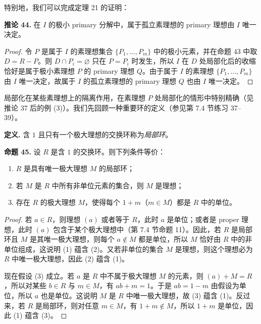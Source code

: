 特别地，我们可以完成定理 21 的证明：

\noindent\textbf{推论 44.} 在 $I$ 的极小 primary 分解中，属于孤立素理想的 primary 理想由 $I$ 唯一决定。

\begin{proof}
	令 $P$ 是属于 $I$ 的素理想集合 $\{P_1,\ldots,P_m\}$ 中的极小元素，并在命题 43 中取 $D=R-P$。则 $D\cap P_i=\varnothing$ 只在 $P=P_i$ 时发生，所以 $I$ 在 $D$ 处局部化后的收缩恰好是属于极小素理想 $P$ 的 primary 理想 $Q$。由于属于 $I$ 的素理想 $\{P_1,\ldots,P_m\}$ 由 $I$ 唯一决定，故属于 $I$ 的孤立素理想的 primary 理想 $Q$ 也由 $I$ 唯一决定。
\end{proof}

局部化在某些素理想上的隔离作用，在素理想 $P$ 处局部化的情形中特别精确（见推论 37 后的例 (3)）。我们先回顾一种重要环的定义（参见第 7.4 节练习 37--39）。

\noindent\textbf{定义.} 含 $1$ 且只有一个极大理想的交换环称为\emph{局部环}。

\noindent\textbf{命题 45.} 设 $R$ 是含 $1$ 的交换环。则下列条件等价：
\begin{enumerate}[label=(\arabic*)]
	\item $R$ 是具有唯一极大理想 $M$ 的局部环；
	\item 若 $M$ 是 $R$ 中所有非单位元素的集合，则 $M$ 是理想；
	\item 存在 $R$ 的极大理想 $M$，使得每个 $1+m$（$m\in M$）都是 $R$ 中的单位。
\end{enumerate}

\begin{proof}
	若 $a\in R$，则理想 $(a)$ 或者等于 $R$，此时 $a$ 是单位；或者是 proper 理想，此时 $(a)$ 包含于某个极大理想中（第 7.4 节命题 11）。因此，若 $R$ 是局部环且 $M$ 是其唯一极大理想，则每个 $a\notin M$ 都是单位，所以 $M$ 恰好由 $R$ 中的非单位组成，这说明 (1) 蕴含 (2)。又若非单位的集合 $M$ 是理想，则这个理想必为 $R$ 中唯一极大理想，因此 (2) 蕴含 (1)。
	
	现在假设 (3) 成立。若 $a$ 是 $R$ 中不属于极大理想 $M$ 的元素，则 $(a)+M=R$，所以对某些 $b\in R$ 与 $m\in M$，有 $ab+m=1$。于是 $ab=1-m$ 由假设为单位，所以 $a$ 也是单位。这说明 $M$ 是 $R$ 中唯一极大理想，故 (3) 蕴含 (1)。反过来，若 $R$ 是局部环，则对任意 $m\in M$，有 $1+m\notin M$，所以 $1+m$ 是单位，因此 (1) 蕴含 (3)。
\end{proof}

